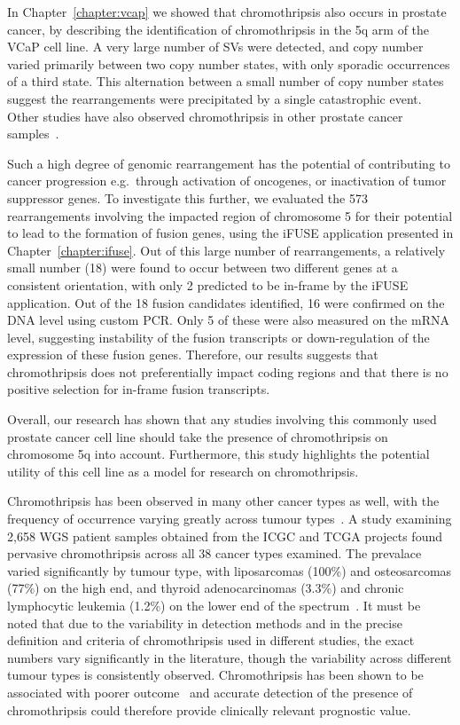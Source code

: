 In Chapter~\ref{chapter:vcap} we showed that chromothripsis also occurs in prostate cancer, by describing the identification of chromothripsis in the 5q arm of the VCaP cell line. A very large number of SVs were detected, and copy number varied primarily between two copy number states, with only sporadic occurrences of a third state. This alternation between a small number of copy number states suggest the rearrangements were precipitated by a single catastrophic event.
Other studies have also observed chromothripsis in other prostate cancer samples~\cite{wu2012poly,Baca2013}.

Such a high degree of genomic rearrangement has the potential of contributing to cancer progression e.g.\ through activation of oncogenes, or inactivation of tumor suppressor genes.
To investigate this further, we evaluated the 573 rearrangements involving the impacted region of chromosome 5 for their potential to lead to the formation of fusion genes, using the iFUSE application presented in Chapter~\ref{chapter:ifuse}.
Out of this large number of rearrangements, a relatively small number (18) were found to occur between two different genes at a consistent orientation, with only 2 predicted to be in-frame by the iFUSE application.
Out of the 18 fusion candidates identified, 16 were confirmed on the DNA level using custom PCR\@.
Only 5 of these were also measured on the mRNA level, suggesting instability of the fusion transcripts or down-regulation of the expression of these fusion genes.
Therefore, our results suggests that chromothripsis does not preferentially impact coding regions and that there is no positive selection for in-frame fusion transcripts.

Overall, our research has shown that any studies involving this commonly used prostate cancer cell line should take the presence of chromothripsis on chromosome 5q into account.
Furthermore, this study highlights the potential utility of this cell line as a model for research on chromothripsis.

Chromothripsis has been observed in many other cancer types as well, with the frequency of occurrence varying greatly across tumour types~\cite{cortes2020comprehensive,voronina2020landscape,Koltsova2019,kloosterman2014prevalence}.
A study examining 2,658 WGS patient samples obtained from the ICGC and TCGA projects found pervasive chromothripsis across all 38 cancer types examined. The prevalace varied significantly by tumour type, with liposarcomas (100\%) and osteosarcomas (77\%) on the high end, and thyroid adenocarcinomas (3.3\%) and chronic lymphocytic leukemia (1.2\%) on the lower end of the spectrum~\cite{cortes2020comprehensive}.
It must be noted that due to the variability in detection methods and in the precise definition and criteria of chromothripsis used in different studies, the exact numbers vary significantly in the literature, though the variability across different tumour types is consistently observed.
Chromothripsis has been shown to be associated with poorer outcome~\cite{fontana2018chromothripsis,Hirsch2012,magrangeas2011chromothripsis,molenaar} and accurate detection of the presence of chromothripsis could therefore provide clinically relevant prognostic value.

